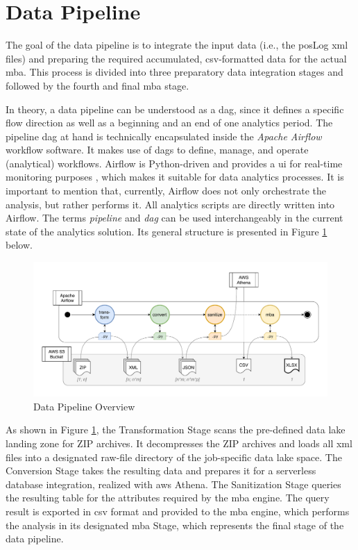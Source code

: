 \section{Data Pipeline}
The goal of the data pipeline is to integrate the input data (i.e., the \ac{pos}Log \ac{xml} files) and preparing the required accumulated, \ac{csv}-formatted data for the actual \ac{mba}. This process is divided into three preparatory data integration stages and followed by the fourth and final \ac{mba} stage.

In theory, a data pipeline can be understood as a \ac{dag}, since it defines a specific flow direction as well as a beginning and an end of one analytics period. The pipeline \ac{dag} at hand is technically encapsulated inside the \textit{Apache Airflow} workflow software. It makes use of \acp{dag} to define, manage, and operate (analytical) workflows. Airflow is Python-driven and provides a \ac{ui} for real-time monitoring purposes \cite{airflow}, which makes it suitable for data analytics processes. It is important to mention that, currently, Airflow does not only orchestrate the analysis, but rather performs it. All analytics scripts are directly written into Airflow. The terms \textit{pipeline} and \textit{\ac{dag}} can be used interchangeably in the current state of the analytics solution. Its general structure is presented in Figure \ref{fig:3-data-pipeline} below.

\begin{figure}[h!]
	\includegraphics[width=\linewidth]{main-matter/img/3-3-data-pipeline.pdf}
	\caption{Data Pipeline Overview}
	\label{fig:3-data-pipeline}	
\end{figure}

As shown in Figure \ref{fig:3-data-pipeline}, the Transformation Stage scans the pre-defined data lake landing zone for ZIP archives. It decompresses the ZIP archives and loads all \ac{xml} files into a designated raw-file directory of the job-specific data lake space. The Conversion Stage takes the resulting data and prepares it for a serverless database integration, realized with \ac{aws} Athena. The Sanitization Stage queries the resulting table for the attributes required by the \ac{mba} engine. The query result is exported in \ac{csv} format and provided to the \ac{mba} engine, which performs the analysis in its designated \ac{mba} Stage, which represents the final stage of the data pipeline.

